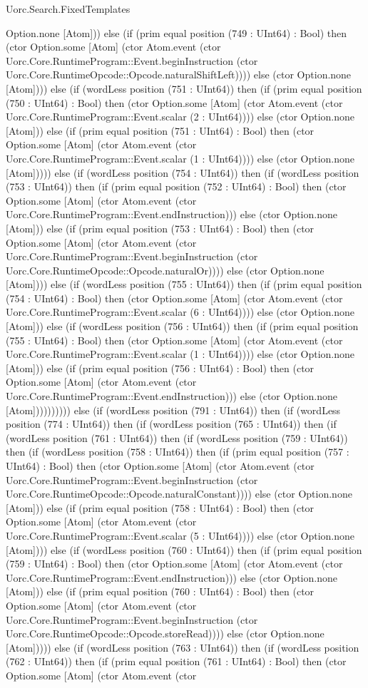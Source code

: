 \begin{lexlean}{Uorc.Search.FixedTemplates}
\begin{semanticmodule}
{Option.none [Atom])) else (if (prim equal position (749 : UInt64) : Bool) then (ctor Option.some [Atom] (ctor Atom.event (ctor Uorc.Core.RuntimeProgram::Event.beginInstruction (ctor Uorc.Core.RuntimeOpcode::Opcode.naturalShiftLeft)))) else (ctor Option.none [Atom]))) else (if (wordLess position (751 : UInt64)) then (if (prim equal position (750 : UInt64) : Bool) then (ctor Option.some [Atom] (ctor Atom.event (ctor Uorc.Core.RuntimeProgram::Event.scalar (2 : UInt64)))) else (ctor Option.none [Atom])) else (if (prim equal position (751 : UInt64) : Bool) then (ctor Option.some [Atom] (ctor Atom.event (ctor Uorc.Core.RuntimeProgram::Event.scalar (1 : UInt64)))) else (ctor Option.none [Atom])))) else (if (wordLess position (754 : UInt64)) then (if (wordLess position (753 : UInt64)) then (if (prim equal position (752 : UInt64) : Bool) then (ctor Option.some [Atom] (ctor Atom.event (ctor Uorc.Core.RuntimeProgram::Event.endInstruction))) else (ctor Option.none [Atom])) else (if (prim equal position (753 : UInt64) : Bool) then (ctor Option.some [Atom] (ctor Atom.event (ctor Uorc.Core.RuntimeProgram::Event.beginInstruction (ctor Uorc.Core.RuntimeOpcode::Opcode.naturalOr)))) else (ctor Option.none [Atom]))) else (if (wordLess position (755 : UInt64)) then (if (prim equal position (754 : UInt64) : Bool) then (ctor Option.some [Atom] (ctor Atom.event (ctor Uorc.Core.RuntimeProgram::Event.scalar (6 : UInt64)))) else (ctor Option.none [Atom])) else (if (wordLess position (756 : UInt64)) then (if (prim equal position (755 : UInt64) : Bool) then (ctor Option.some [Atom] (ctor Atom.event (ctor Uorc.Core.RuntimeProgram::Event.scalar (1 : UInt64)))) else (ctor Option.none [Atom])) else (if (prim equal position (756 : UInt64) : Bool) then (ctor Option.some [Atom] (ctor Atom.event (ctor Uorc.Core.RuntimeProgram::Event.endInstruction))) else (ctor Option.none [Atom]))))))))) else (if (wordLess position (791 : UInt64)) then (if (wordLess position (774 : UInt64)) then (if (wordLess position (765 : UInt64)) then (if (wordLess position (761 : UInt64)) then (if (wordLess position (759 : UInt64)) then (if (wordLess position (758 : UInt64)) then (if (prim equal position (757 : UInt64) : Bool) then (ctor Option.some [Atom] (ctor Atom.event (ctor Uorc.Core.RuntimeProgram::Event.beginInstruction (ctor Uorc.Core.RuntimeOpcode::Opcode.naturalConstant)))) else (ctor Option.none [Atom])) else (if (prim equal position (758 : UInt64) : Bool) then (ctor Option.some [Atom] (ctor Atom.event (ctor Uorc.Core.RuntimeProgram::Event.scalar (5 : UInt64)))) else (ctor Option.none [Atom]))) else (if (wordLess position (760 : UInt64)) then (if (prim equal position (759 : UInt64) : Bool) then (ctor Option.some [Atom] (ctor Atom.event (ctor Uorc.Core.RuntimeProgram::Event.endInstruction))) else (ctor Option.none [Atom])) else (if (prim equal position (760 : UInt64) : Bool) then (ctor Option.some [Atom] (ctor Atom.event (ctor Uorc.Core.RuntimeProgram::Event.beginInstruction (ctor Uorc.Core.RuntimeOpcode::Opcode.storeRead)))) else (ctor Option.none [Atom])))) else (if (wordLess position (763 : UInt64)) then (if (wordLess position (762 : UInt64)) then (if (prim equal position (761 : UInt64) : Bool) then (ctor Option.some [Atom] (ctor Atom.event (ctor }
\end{semanticmodule}
\end{lexlean}
